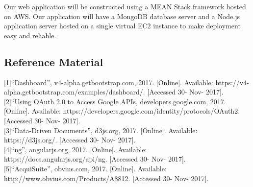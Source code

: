 \documentclass[journal,10pt,onecolumn,compsoc]{IEEEtran}
\begin{document}
    \noindent Our web application will be constructed using a MEAN Stack framework hosted on AWS. Our application will have a MongoDB database server and a Node.js application server hosted on a single virtual EC2 instance to make deployment easy and reliable.
   
	\subsection{Reference Material}
	{[1]}``Dashboard'', v4-alpha.getbootstrap.com, 2017. [Online]. Available: https://v4-alpha.getbootstrap.com/examples/dashboard/. [Accessed 30- Nov- 2017]. \\
	{[2]}``Using OAuth 2.0 to Access Google APIs, developers.google.com, 2017. [Online]. Available: 		https://developers.google.com/identity/protocols/OAuth2. [Accessed 30- Nov- 2017]. \\
	{[3]}``Data-Driven Documents'', d3js.org, 2017. [Online]. Available: https://d3js.org/. [Accessed 30- Nov- 2017]. \\
	{[4]}``ng'', angularjs.org, 2017. [Online]. Available: https://docs.angularjs.org/api/ng. [Accessed 30- Nov- 2017]. \\
	{[5]}``AcquiSuite'', obvius.com, 2017. [Online]. Available: http://www.obvius.com/Products/A8812. [Accessed 30- Nov- 2017]. \\
	
\end{document}
